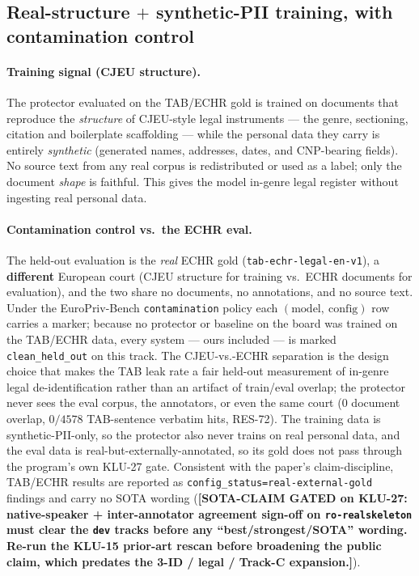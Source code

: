 \documentclass[11pt]{article}
\newcommand{\sotagate}{\textbf{[SOTA-CLAIM GATED on KLU-27: native-speaker + inter-annotator
agreement sign-off on \texttt{ro-realskeleton} must clear the \texttt{dev} tracks before any
``best/strongest/SOTA'' wording. Re-run the KLU-15 prior-art rescan before broadening the public
claim, which predates the 3-ID / legal / Track-C expansion.]}}
\begin{document}
\subsection{Real-structure $+$ synthetic-PII training, with contamination control}
\label{subsec:cjeu-training}
\paragraph{Training signal (CJEU structure).}
The protector evaluated on the TAB/ECHR gold is trained on documents that reproduce the
\emph{structure} of CJEU-style legal instruments --- the genre, sectioning, citation and
boilerplate scaffolding --- while the personal data they carry is entirely
\emph{synthetic} (generated names, addresses, dates, and CNP-bearing fields). No source
text from any real corpus is redistributed or used as a label; only the document
\emph{shape} is faithful. This gives the model in-genre legal register without ingesting
real personal data.

\paragraph{Contamination control vs.\ the ECHR eval.}
The held-out evaluation is the \emph{real} ECHR gold (\texttt{tab-echr-legal-en-v1}), a
\textbf{different} European court (CJEU structure for training vs.\ ECHR documents for
evaluation), and the two share no documents, no annotations, and no source text. Under the
EuroPriv-Bench \texttt{contamination} policy each $(\text{model},\ \text{config})$ row
carries a marker; because no protector or baseline on the board was trained on the TAB/ECHR
data, every system --- ours included --- is marked \texttt{clean\_held\_out} on this track.
The CJEU-vs.-ECHR separation is the design choice that makes the TAB leak rate a fair
held-out measurement of in-genre legal de-identification rather than an artifact of
train/eval overlap; the protector never sees the eval corpus, the annotators, or even the
same court ($0$ document overlap, $0/4578$ TAB-sentence verbatim hits, RES-72). The training
data is synthetic-PII-only, so the protector also never trains on real personal data, and
the eval data is real-but-externally-annotated, so its gold does not pass through the
program's own KLU-27 gate. Consistent with the paper's claim-discipline, TAB/ECHR results
are reported as \texttt{config\_status=real-external-gold} findings and carry no SOTA
wording (\sotagate{}).
\end{document}
